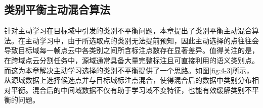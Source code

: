     \subsection{类别平衡主动混合算法}  %
    针对主动学习在目标域中引发的类别不平衡问题，本章提出了类别平衡主动混合算法。在主动学习中，由于所选取点的类别无法提前预知，因此主动选择的点往往会导致目标域每一帧点云中各类别之间所含标注点数存在显著差异。值得关注的是，在跨域点云分割任务中，源域通常具备大量完整标注且可直接利用的语义类别点。而这为本章解决主动学习选择的类别不平衡提供了一个思路。如图\ref{fig:4-3}所示，从源域数据上选择候选点并与目标域标注点混合，使得混合后的数据中类别分布相对平衡。混合后的中间域数据不仅有助于学习域不变特征，也能有效缓解类别不平衡的问题。%
